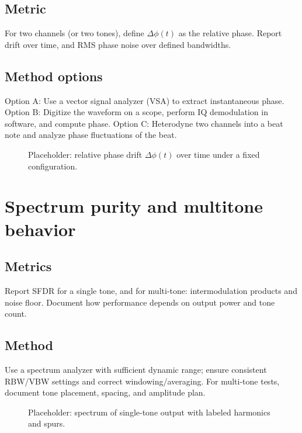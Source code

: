 \subsection{Metric}
For two channels (or two tones), define $\Delta\phi(t)$ as the relative phase. Report drift over time, and RMS
phase noise over defined bandwidths.

\subsection{Method options}
Option A: Use a vector signal analyzer (VSA) to extract instantaneous phase.
Option B: Digitize the waveform on a scope, perform IQ demodulation in software, and compute phase.
Option C: Heterodyne two channels into a beat note and analyze phase fluctuations of the beat.

\begin{figure}[t]
  \centering
  \caption{Placeholder: relative phase drift $\Delta\phi(t)$ over time under a fixed configuration.}
  \label{fig:result_phase_drift}
\end{figure}

\section{Spectrum purity and multitone behavior}
\subsection{Metrics}
Report SFDR for a single tone, and for multi-tone: intermodulation products and noise floor.
Document how performance depends on output power and tone count.

\subsection{Method}
Use a spectrum analyzer with sufficient dynamic range; ensure consistent RBW/VBW settings and correct
windowing/averaging. For multi-tone tests, document tone placement, spacing, and amplitude plan.

\begin{figure}[t]
  \centering
  \caption{Placeholder: spectrum of single-tone output with labeled harmonics and spurs.}
  \label{fig:result_spectrum_single}
\end{figure}

